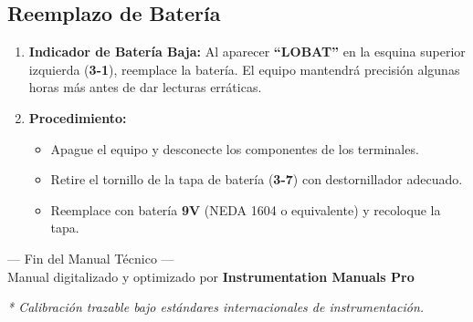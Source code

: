 \documentclass[11pt]{article}
\begin{document}
\subsection{Reemplazo de Batería}
\begin{enumerate}[label=\small\color{IndustrialBlue}\bfseries\arabic*., leftmargin=1.4cm, itemsep=5pt]
    \item \textbf{Indicador de Batería Baja:} Al aparecer \textbf{``LOBAT''} en la esquina superior izquierda (\textbf{3-1}), reemplace la batería. El equipo mantendrá precisión algunas horas más antes de dar lecturas erráticas.
    \item \textbf{Procedimiento:}
    \begin{itemize}[label=$\circ$, nosep]
        \item Apague el equipo y desconecte los componentes de los terminales.
        \item Retire el tornillo de la tapa de batería (\textbf{3-7}) con destornillador adecuado.
        \item Reemplace con batería \textbf{9V} (NEDA 1604 o equivalente) y recoloque la tapa.
    \end{itemize}
\end{enumerate}

\vfill
\begin{center}
    \footnotesize\color{DarkGray}
    --- Fin del Manual Técnico ---\\[2pt]
    Manual digitalizado y optimizado por \textbf{Instrumentation Manuals Pro}
\end{center}

\vfill
\noindent\textit{* Calibración trazable bajo estándares internacionales de instrumentación.}
\end{document}
